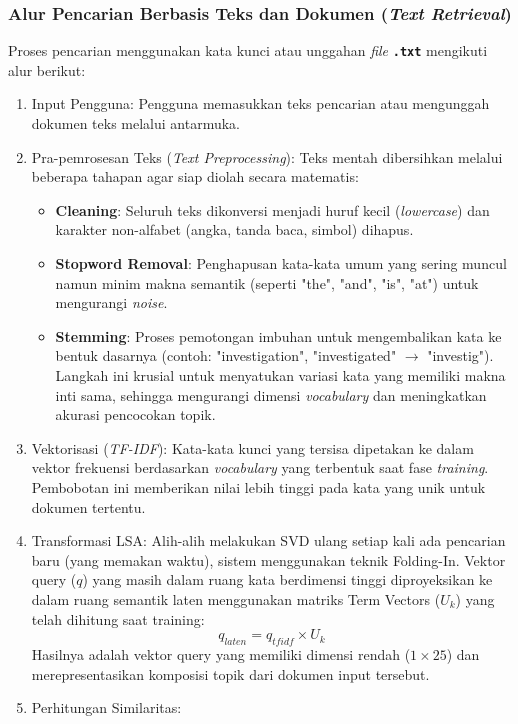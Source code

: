 \documentclass[12pt,a4paper]{article}
\begin{document}
\subsubsection{Alur Pencarian Berbasis Teks dan Dokumen (\textit{Text Retrieval})}
Proses pencarian menggunakan kata kunci atau unggahan \textit{file} \textbf{\texttt{.txt}} mengikuti alur berikut:
\begin{enumerate}
    \item Input Pengguna: Pengguna memasukkan teks pencarian atau mengunggah dokumen teks melalui antarmuka.
    \item Pra-pemrosesan Teks (\textit{Text Preprocessing}):
    Teks mentah dibersihkan melalui beberapa tahapan agar siap diolah secara matematis:
    \begin{itemize}
        \item \textbf{Cleaning}: Seluruh teks dikonversi menjadi huruf kecil (\textit{lowercase}) dan karakter non-alfabet (angka, tanda baca, simbol) dihapus.
        \item \textbf{Stopword Removal}: Penghapusan kata-kata umum yang sering muncul namun minim makna semantik (seperti "the", "and", "is", "at") untuk mengurangi \textit{noise}.
        \item \textbf{Stemming}: Proses pemotongan imbuhan untuk mengembalikan kata ke bentuk dasarnya (contoh: "investigation", "investigated" $\rightarrow$ "investig"). Langkah ini krusial untuk menyatukan variasi kata yang memiliki makna inti sama, sehingga mengurangi dimensi \textit{vocabulary} dan meningkatkan akurasi pencocokan topik.
    \end{itemize}
    \item Vektorisasi (\textit{TF-IDF}): Kata-kata kunci yang tersisa dipetakan ke dalam vektor frekuensi berdasarkan \textit{vocabulary} yang terbentuk saat fase \textit{training}. Pembobotan ini memberikan nilai lebih tinggi pada kata yang unik untuk dokumen tertentu.
    \item Transformasi LSA: Alih-alih melakukan SVD ulang setiap kali ada pencarian baru (yang memakan waktu), sistem menggunakan teknik Folding-In. Vektor query ($q$) yang masih dalam ruang kata berdimensi tinggi diproyeksikan ke dalam ruang semantik laten menggunakan matriks Term Vectors ($U_k$) yang telah dihitung saat training:$$q_{laten} = q_{tfidf} \times U_k$$Hasilnya adalah vektor query yang memiliki dimensi rendah ($1 \times 25$) dan merepresentasikan komposisi topik dari dokumen input tersebut.
    \item Perhitungan Similaritas:

\end{enumerate}
\end{document}
